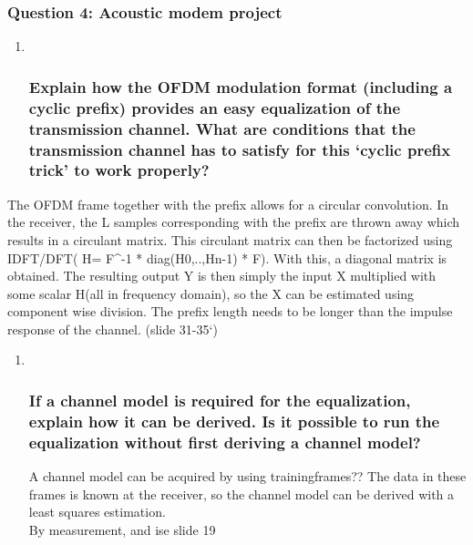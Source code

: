 \documentclass[
  a4paper,
  ,captions=tableheading
]{scrartcl}
\begin{document}
\subsubsection{Question 4: Acoustic modem
project}\label{question-4-acoustic-modem-project}

\begin{enumerate}
\def\labelenumi{\arabic{enumi}.}
\item ~
  \subsubsection{Explain how the OFDM modulation format (including a
  cyclic prefix) provides an easy equalization of the transmission
  channel. What are conditions that the transmission channel has to
  satisfy for this `cyclic prefix trick' to work
  properly?}\label{explain-how-the-ofdm-modulation-format-including-a-cyclic-prefix-provides-an-easy-equalization-of-the-transmission-channel.-what-are-conditions-that-the-transmission-channel-has-to-satisfy-for-this-cyclic-prefix-trick-to-work-properly}
\end{enumerate}

The OFDM frame together with the prefix allows for a circular
convolution. In the receiver, the L samples corresponding with the
prefix are thrown away which results in a circulant matrix. This
circulant matrix can then be factorized using IDFT/DFT( H= F\^{}-1 *
diag(H0,..,Hn-1) * F). With this, a diagonal matrix is obtained. The
resulting output Y is then simply the input X multiplied with some
scalar H(all in frequency domain), so the X can be estimated using
component wise division. The prefix length needs to be longer than the
impulse response of the channel. (slide 31-35`)

\begin{enumerate}
\def\labelenumi{\arabic{enumi}.}
\setcounter{enumi}{1}
\item ~
  \subsubsection{If a channel model is required for the equalization,
  explain how it can be derived. Is it possible to run the equalization
  without first deriving a channel
  model?}\label{if-a-channel-model-is-required-for-the-equalization-explain-how-it-can-be-derived.-is-it-possible-to-run-the-equalization-without-first-deriving-a-channel-model}

  A channel model can be acquired by using trainingframes?? The data in
  these frames is known at the receiver, so the channel model can be
  derived with a least squares estimation.\\
  By measurement, and ise slide 19
\end{enumerate}
\end{document}
